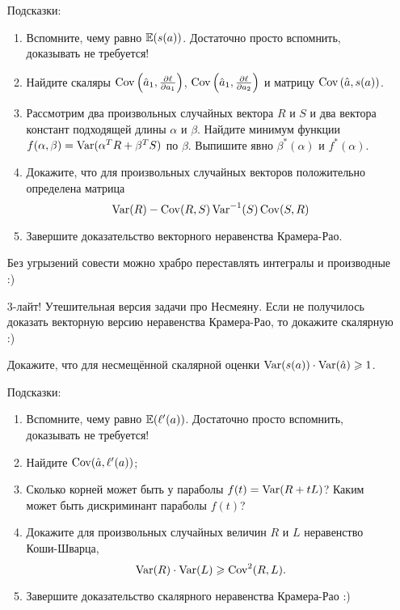 \begin{enumerate}
Подсказки:

    \begin{enumerate}
      \item Вспомните, чему равно $\mathbb{E}(s(a))$. Достаточно просто вспомнить, доказывать не требуется!
      \item Найдите скаляры $\operatorname{Cov}\left(\hat a_1, \frac{\partial \ell}{\partial a_1}\right)$,
	$\operatorname{Cov}\left(\hat a_1, \frac{\partial \ell}{\partial a_2}\right)$
	и матрицу $\operatorname{Cov}\left(\hat a, s(a) \right)$.
      \item Рассмотрим два произвольных случайных вектора $R$ и $S$ и два вектора констант подходящей длины $\alpha$ и $\beta$.
	Найдите минимум функции $f(\alpha, \beta) = \operatorname{Var}(\alpha^T R + \beta^T S)$ по $\beta$.
	Выпишите явно $\beta^*(\alpha)$ и $f^*(\alpha)$.
      \item Докажите, что для произвольных случайных векторов положительно определена матрица
	\[
          \operatorname{Var}(R) - \operatorname{Cov}(R, S) \operatorname{Var}^{-1}(S)\operatorname{Cov}(S, R)
	\]
      \item Завершите доказательство векторного неравенства Крамера-Рао.


    \end{enumerate}

  Без угрызений совести можно храбро переставлять интегралы и производные :)

  \item[3-лайт!] Утешительная версия задачи про Несмеяну. Если не получилось доказать векторную версию неравенства Крамера-Рао, то докажите скалярную :)

    Докажите, что для несмещённой скалярной оценки  $\operatorname{Var}(s(a))\cdot \operatorname{Var}(\hat a) \geqslant 1$.

    Подсказки:

    \begin{enumerate}

      \item Вспомните, чему равно $\mathbb{E}(\ell'(a))$. Достаточно просто вспомнить, доказывать не требуется!
      \item Найдите $\operatorname{Cov}(\hat a, \ell'(a))$;
      \item Сколько корней может быть у параболы $f(t)=\operatorname{Var}(R + tL)$? Каким может быть дискриминант параболы $f(t)$?
      \item  Докажите для произвольных случайных величин $R$ и $L$ неравенство Коши-Шварца,
	\[
	  \operatorname{Var}(R) \cdot \operatorname{Var}(L) \geqslant \operatorname{Cov}^2(R, L) .
	\]
    \item Завершите доказательство скалярного неравенства Крамера-Рао :)
    \end{enumerate}



\end{enumerate}
